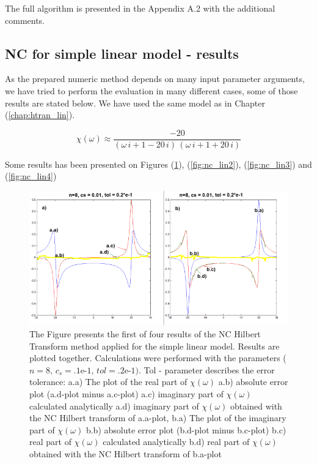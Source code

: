 \documentclass[12pt,twoside,a4paper]{article}
\numberwithin{equation}{subsection}
\numberwithin{figure}{subsection}
\begin{document}
The full algorithm is presented in the Appendix A.2 with the additional comments. 

\subsection{NC for simple linear model - results} \label{chap:nc_lin}

As the prepared numeric method depends on many input parameter arguments, we have tried to perform the evaluation in many different cases, some of those results are stated below. We have used the same model as in Chapter (\ref{chap:htran_lin}).

\begin{equation} \label{eq:nc_algoritm}
  \chi (\omega ) \approx \frac { - 20}{(\omega \,i + 1 - 20\,i)\,(\omega \,i + 1 + 20\,i)}
\end{equation} 

Some results has been presented on Figures (\ref{fig:nc_lin1}), (\ref{fig:nc_lin2}), (\ref{fig:nc_lin3}) and (\ref{fig:nc_lin4})

\begin{figure}
  \includegraphics[width=150mm]{img/nc_lin1.png}
   \caption{ The Figure presents the first of four results of the NC Hilbert Transform method applied for the simple linear model. Results are plotted together. Calculations were performed with the parameters ($n = 8, \, c_s = \mbox{.1e-1}, \, tol = \mbox{.2e-1})$. Tol - parameter describes the error tolerance:
     a.a) The plot of the real part of $\chi (\omega )$ 
     a.b) absolute error plot (a.d-plot minus a.c-plot) 
     a.c) imaginary part of $\chi (\omega )$ calculated analytically 
     a.d) imaginary part of $\chi (\omega )$ obtained with the NC Hilbert transform of a.a-plot, 
     b.a) The plot of the imaginary part of $\chi (\omega )$ 
     b.b) absolute error plot (b.d-plot minus b.c-plot) 
     b.c) real part of $\chi (\omega )$ calculated analytically 
     b.d) real part of $\chi (\omega )$ obtained with the NC Hilbert transform of b.a-plot 
     \label{fig:nc_lin1}
  }
\end{figure}
\end{document}
